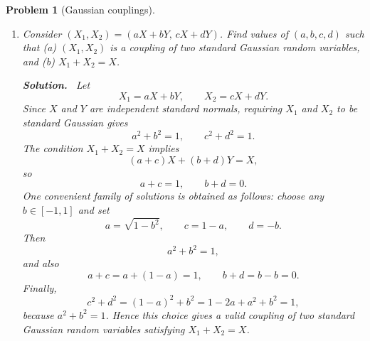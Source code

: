 \documentclass[11pt]{article}
\newtheorem{problem}{Problem}
\newenvironment{solution}{\par\noindent\textbf{Solution.}\ }{\par}
\begin{document}
\begin{problem}[Gaussian couplings]
\begin{enumerate}
\begin{solution}
For a numerical check, I simulated $n = 10^5$ i.i.d. pairs $(X_i,Y_i)$ from $N(0,1)$
and formed
\[
  Z_{\rho,i} = \rho X_i + \sqrt{1-\rho^2}\,Y_i, \qquad i = 1,\dots,n,
\]
for $\rho \in \{1,0,-1\}$. A short Python script produced scatterplots of
$(X_i,Z_{\rho,i})$ and overlaid histograms of the marginals $X$ and $Z_\rho$; the
resulting figures are included below.

In all three cases, the histograms of $X$ and $Z_\rho$ look almost identical and
match the bell shape of the standard normal density, so both marginals are close
to $N(0,1)$. The scatterplots have sample correlations close to $\rho$, so we
see the coupling move from identical ($\rho=1$) to independent ($\rho=0$) to
antithetic ($\rho=-1$).
\end{solution}

\item Consider $(X_1,X_2) = (aX + bY,\, cX + dY)$. Find values of $(a,b,c,d)$ such
that (a) $(X_1,X_2)$ is a coupling of two standard Gaussian random variables, and
(b) $X_1 + X_2 = X$.

\begin{solution}
Let
\[
  X_1 = aX + bY, \qquad X_2 = cX + dY.
\]
Since $X$ and $Y$ are independent standard normals, requiring $X_1$ and $X_2$ to be
standard Gaussian gives
\[
  a^2 + b^2 = 1, \qquad c^2 + d^2 = 1.
\]
The condition $X_1 + X_2 = X$ implies
\[
  (a+c)X + (b+d)Y = X,
\]
so
\[
  a + c = 1, \qquad b + d = 0.
\]
One convenient family of solutions is obtained as follows: choose any $b \in [-1,1]$
and set
\[
  a = \sqrt{1-b^2}, \qquad c = 1-a, \qquad d = -b.
\]
Then
\[
  a^2 + b^2 = 1,
\]
and also
\[
  a + c = a + (1-a) = 1, \qquad b + d = b-b = 0.
\]
Finally,
\[
  c^2 + d^2 = (1-a)^2 + b^2 = 1-2a + a^2 + b^2 = 1,
\]
because $a^2 + b^2 = 1$. Hence this choice gives a valid coupling of two standard
Gaussian random variables satisfying $X_1 + X_2 = X$.\qedhere
\end{solution}

\end{enumerate}
\end{problem}

\bigskip
\end{document}
